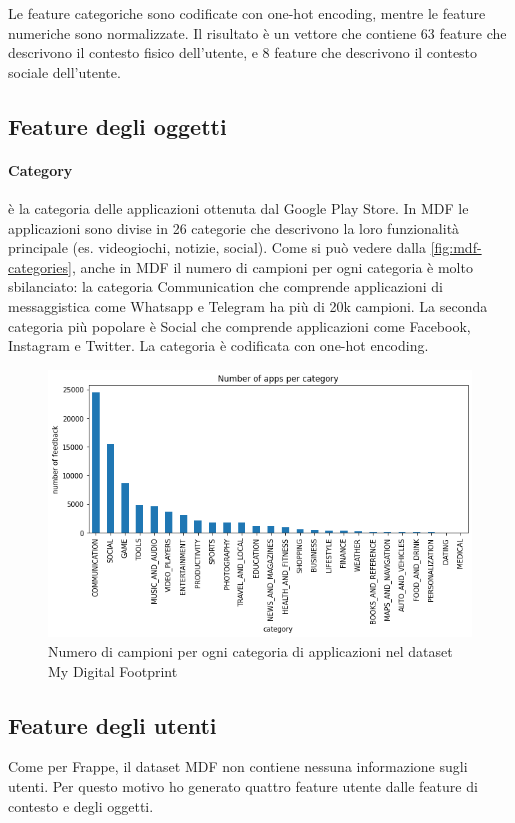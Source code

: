 \documentclass[12pt,italian]{report}
\begin{document}
\bigskip \noindent
Le feature categoriche sono codificate con one-hot encoding, mentre le feature numeriche sono normalizzate. Il risultato è un vettore che contiene 63 feature che descrivono il contesto fisico dell'utente, e 8 feature che descrivono il contesto sociale dell'utente.

\subsection{Feature degli oggetti}

\paragraph{Category}
è la categoria delle applicazioni ottenuta dal Google Play Store. In
MDF le applicazioni sono divise in 26 categorie che descrivono la loro funzionalità principale (es. videogiochi, notizie, social). Come si può vedere dalla \autoref{fig:mdf-categories}, anche in MDF il numero di campioni per ogni categoria è molto sbilanciato: la categoria Communication che comprende applicazioni di messaggistica come Whatsapp e Telegram ha più di
20k campioni. La seconda categoria più popolare è Social che comprende applicazioni come Facebook, Instagram e Twitter. La categoria è codificata con one-hot encoding.

\begin{figure}
  \centering
  \includegraphics[width=\linewidth]{immagini/mdf-category.png}
  \caption{Numero di campioni per ogni categoria di applicazioni nel dataset My Digital Footprint}
  \label{fig:mdf-categories}
\end{figure}

\subsection{Feature degli utenti}
Come per Frappe, il dataset MDF non contiene nessuna informazione sugli utenti. Per questo motivo ho generato quattro feature utente dalle feature di contesto e degli oggetti.
\end{document}
